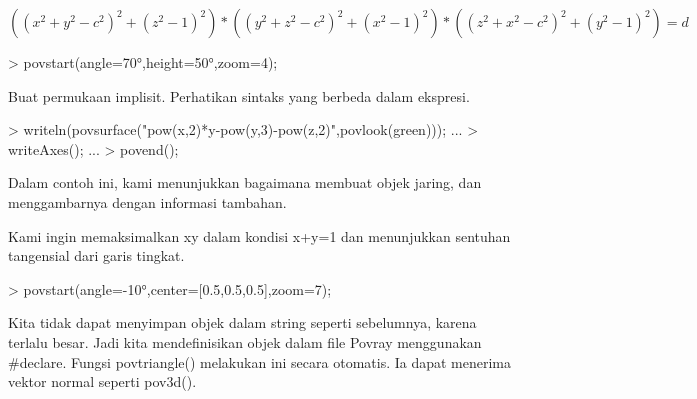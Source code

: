 \documentclass[a4paper,10pt]{article}
\begin{document}
\begin{eulernotebook}
\begin{eulercomment}
\begin{eulercomment}
\begin{eulercomment}
\end{eulercomment}
\begin{eulerformula}
\[
((x^2+y^2-c^2)^2+(z^2-1)^2)*((y^2+z^2-c^2)^2+(x^2-1)^2)*((z^2+x^2-c^2)^2+(y^2-1)^2)=d
\]
\end{eulerformula}
\begin{eulerprompt}
> povstart(angle=70°,height=50°,zoom=4);
\end{eulerprompt}
\begin{eulercomment}
Buat permukaan implisit. Perhatikan sintaks yang berbeda dalam
ekspresi.
\end{eulercomment}
\begin{eulerprompt}
> writeln(povsurface("pow(x,2)*y-pow(y,3)-pow(z,2)",povlook(green))); ...
> writeAxes(); ...
> povend();
\end{eulerprompt}
\begin{eulercomment}
Dalam contoh ini, kami menunjukkan bagaimana membuat objek jaring, dan
menggambarnya dengan informasi tambahan.

Kami ingin memaksimalkan xy dalam kondisi x+y=1 dan menunjukkan
sentuhan tangensial dari garis tingkat.
\end{eulercomment}
\begin{eulerprompt}
> povstart(angle=-10°,center=[0.5,0.5,0.5],zoom=7);
\end{eulerprompt}
\begin{eulercomment}
Kita tidak dapat menyimpan objek dalam string seperti sebelumnya,
karena terlalu besar. Jadi kita mendefinisikan objek dalam file Povray
menggunakan #declare. Fungsi povtriangle() melakukan ini secara
otomatis. Ia dapat menerima vektor normal seperti pov3d().


\end{eulercomment}
\end{eulercomment}
\end{eulercomment}
\end{eulernotebook}
\end{document}
